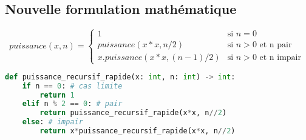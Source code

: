 \documentclass[a4paper,11pt]{article}
\begin{document}
\subsection{Nouvelle formulation mathématique}
$$
puissance(x,n) = \left\{
    \begin{array}{ll}
        1 & \mbox{si } n=0 \\
        puissance(x*x,n/2) & \mbox{si } n>0 \mbox{ et n pair}\\
        x.puissance(x*x,(n-1)/2) & \mbox{si } n>0 \mbox{ et n impair}\
    \end{array}
\right.$$
\begin{center}
    \begin{lstlisting}[language=Python , basicstyle=\ttfamily\small, xleftmargin=0.5em, xrightmargin=0.5em]
def puissance_recursif_rapide(x: int, n: int) -> int:
    if n == 0: # cas limite
        return 1
    elif n % 2 == 0: # pair
        return puissance_recursif_rapide(x*x, n//2)
    else: # impair
        return x*puissance_recursif_rapide(x*x, n//2)
\end{lstlisting}
    \label{CODE}
    \end{center}
\end{document}
